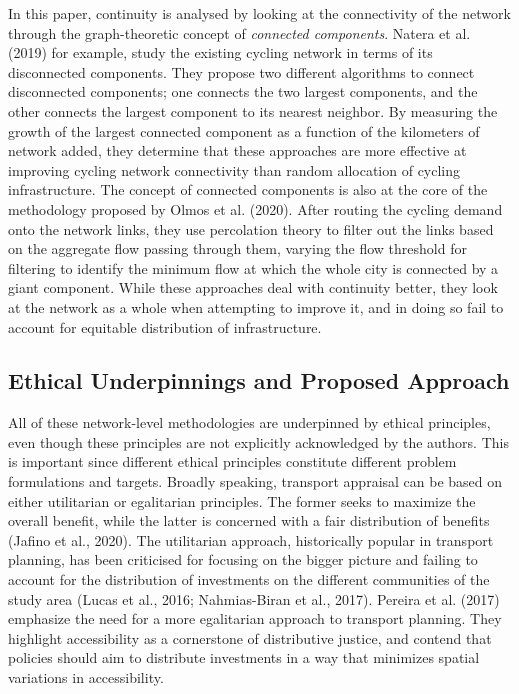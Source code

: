 \documentclass[
]{article}
\begin{document}
In this paper, continuity is analysed by looking at the connectivity of
the network through the graph-theoretic concept of \emph{connected
components}. Natera et al. (2019) for example,
study the existing cycling network in terms of its disconnected
components. They propose two different algorithms to connect disconnected components; one connects the two largest components, and the other connects the largest component to its nearest neighbor. By measuring the growth of the largest connected component as a function of the kilometers of network added, they determine that these approaches are more effective at improving cycling network connectivity than random allocation of cycling infrastructure.
The concept of connected components is
also at the core of the methodology proposed by Olmos et al. (2020). After
routing the cycling demand onto the network links, they use percolation
theory to filter out the links based on the aggregate flow passing through them, varying the flow threshold for
filtering to identify the minimum flow at which the whole city is
connected by a giant component. While these approaches deal with
continuity better, they look at the network as a whole when attempting
to improve it, and in doing so fail to account for equitable
distribution of infrastructure.

\hypertarget{ethical-underpinnings-and-proposed-approach}{%
\subsection{Ethical Underpinnings and Proposed Approach}\label{ethical-underpinnings-and-proposed-approach}}

All of these network-level methodologies are underpinned by ethical
principles, even though these principles are not explicitly acknowledged
by the authors. This is important since different ethical principles
constitute different problem formulations and targets. Broadly speaking,
transport appraisal can be based on either utilitarian or egalitarian
principles. The former seeks to maximize the overall benefit, while the
latter is concerned with a fair distribution of benefits
(Jafino et al., 2020).
The utilitarian approach, historically popular in transport planning, has been criticised for focusing on the bigger picture and failing to account for the distribution of investments on the different communities of the study area (Lucas et al., 2016; Nahmias-Biran et al., 2017).
Pereira et al. (2017) emphasize the need for a more
egalitarian approach to transport planning. They highlight accessibility
as a cornerstone of distributive justice, and contend that policies
should aim to distribute investments in a way that minimizes spatial
variations in accessibility.
\end{document}
